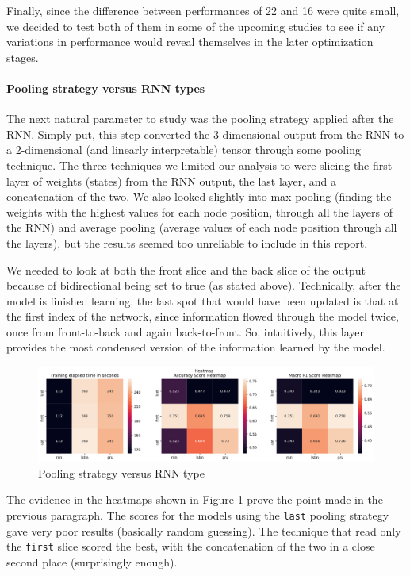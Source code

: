 Finally, since the difference between performances of 22 and 16 were quite small, we decided to test both of them in some of the upcoming studies to see if any variations in performance would reveal themselves in the later optimization stages.

\paragraph{Pooling strategy versus RNN types}
The next natural parameter to study was the pooling strategy applied after the RNN. Simply put, this step converted the 3-dimensional output from the RNN to a 2-dimensional (and linearly interpretable) tensor through some pooling technique. The three techniques we limited our analysis to were slicing the first layer of weights (states) from the RNN output, the last layer, and a concatenation of the two. We also looked slightly into max-pooling (finding the weights with the highest values for each node position, through all the layers of the RNN) and average pooling (average values of each node position through all the layers), but the results seemed too unreliable to include in this report. 

We needed to look at both the front slice and the back slice of the output because of bidirectional being set to true (as stated above). Technically, after the model is finished learning, the last spot that would have been updated is that at the first index of the network, since information flowed through the model twice, once from front-to-back and again back-to-front. So, intuitively, this layer provides the most condensed version of the information learned by the model.

\begin{figure}[H]
    \centering
    \includegraphics[width=1\linewidth]{pictures/PoolTypeRnnType_heatmap.png}
    \caption{Pooling strategy versus RNN type}
    \label{fig:pool_rnn}
\end{figure}

The evidence in the heatmaps shown in Figure \ref{fig:pool_rnn} prove the point made in the previous paragraph. The scores for the models using the \texttt{last} pooling strategy gave very poor results (basically random guessing). The technique that read only the \texttt{first} slice scored the best, with the concatenation of the two in a close second place (surprisingly enough). 

